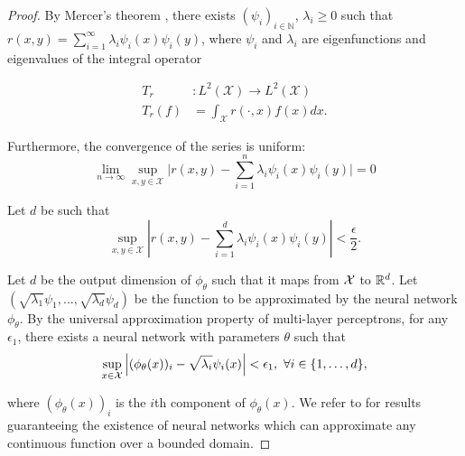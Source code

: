 \begin{proof}
	\hphantom{~}

	By Mercer's theorem \parencite{mercerFunctionsPositive1909, sunMercerTheorem2005, micchelliUniversalKernels2006}, there exists \((\psi_i)_{i \in \mathbb{N}}\), \(\lambda_i \geq 0\) such that \(r(x,y) = \sum_{i=1}^{\infty}{\lambda_i \psi_i(x) \psi_i(y)}\), where \(\psi_i\) and \(\lambda_i\) are eigenfunctions and eigenvalues of the integral operator

	\begin{align*}
		T_r&: L^2(\mathcal{X}) \to L^2(\mathcal{X}) \\
		T_r(f) &= \int_{\mathcal{X}}{r(\cdot, x) f(x) dx}.
	\end{align*}

	Furthermore, the convergence of the series is uniform:
	\begin{equation}
		\lim_{n \to \infty} \sup_{x,y \in \mathcal{X}} \lvert r(x,y) - \sum_{i=1}^{n}{\lambda_i \psi_i(x) \psi_i(y) \rvert} = 0
	\end{equation}

	Let \(d\) be such that
	\begin{equation}
		\label{eq:proof_mercer_thm_unif_abs_cv}
		\sup_{x,y \in \mathcal{X}} \left\lvert r(x,y) - \sum_{i=1}^{d}{\lambda_i \psi_i(x) \psi_i(y)} \right\rvert < \frac{\epsilon}{2}.
	\end{equation}

	Let $d$ be the output dimension of \(\phi_\theta\) such that it maps from ${\mathcal{X}}$ to $\mathbb{R}^d$. Let \((\sqrt{\lambda_1} \psi_1, \ldots, \sqrt{\lambda_{d}} \psi_{d})\) be the function to be approximated by the neural network \(\phi_\theta\). By the universal approximation property of multi-layer perceptrons, for any \(\epsilon_1\), there exists a neural network with parameters \(\theta\) such that
	\begin{equation}
		\label{eq:proof_NN_UAP}
		\sup_{x\in \mathcal{X}}{\left\lvert(\phi_\theta(x))_i - \sqrt{\lambda_i} \psi_i(x)\right\rvert} < \epsilon_1, \ \forall i \in \{1, \ldots, d\},
	\end{equation}

    \noindent where $(\phi_\theta(x))_i$ is the \(i\)th component of $\phi_\theta(x)$. We refer to \parencite{hornikMultilayerFeedforward1989, cybenkoApproximationSuperpositions1989, barronUniversalApproximation1993} for results guaranteeing the existence of neural networks which can approximate any continuous function over a bounded domain.


\end{proof}
